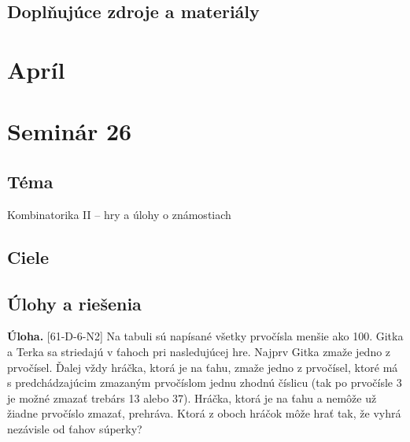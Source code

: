 \documentclass[11pt,a4paper,oneside,final]{book}
\newcommand{\ul}{\textbf{Úloha.} }
\begin{document}
\subsection*{Doplňujúce zdroje a materiály}

\newpage
\section{Apríl}
\section*{Seminár 26}
\subsection*{Téma}
Kombinatorika II -- hry a úlohy o známostiach
\subsection*{Ciele}

\subsection*{Úlohy a riešenia}
\begin{tcolorbox}[breakable,notitle,boxrule=0pt,colback=light-gray,colframe=light-gray]\ul [61-D-6-N2] Na tabuli sú napísané všetky prvočísla menšie ako 100. Gitka a Terka sa striedajú v ťahoch pri nasledujúcej hre. Najprv Gitka zmaže jedno z prvočísel. Ďalej vždy hráčka, ktorá je na ťahu, zmaže jedno z prvočísel, ktoré má s predchádzajúcim zmazaným prvočíslom jednu zhodnú číslicu (tak po prvočísle 3 je možné zmazať trebárs 13 alebo 37). Hráčka, ktorá je na ťahu a nemôže už žiadne prvočíslo zmazať, prehráva. Ktorá z oboch hráčok môže hrať tak, že vyhrá nezávisle od ťahov súperky?

\end{tcolorbox}
\end{document}
